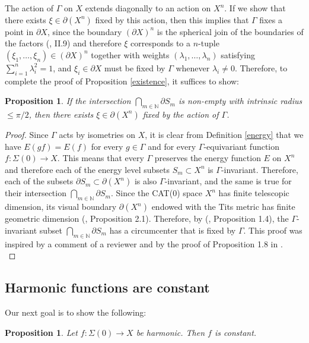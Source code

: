 \documentclass{article}
\theoremstyle{definition}
\theoremstyle{remark}
\theoremstyle{plain}
\newtheorem{prp}[dfn]{Proposition}
\begin{document}
The action of $\Gamma$ on $X$ extends diagonally to an action on $X^n$. If we show that there exists $\xi\in\partial(X^n)$ fixed by this action, then this implies that $\Gamma$ fixes a point in $\partial X$, since the boundary $(\partial X)^n$ is the spherical join of the boundaries of the factors (\cite{bh}, II.9) and therefore $\xi$ corresponds to a $n$-tuple $(\xi_1,\ldots,\xi_n)\in(\partial X)^n$ together with weights $(\lambda_1,\ldots,\lambda_n)$ satisfying $\sum_{i=1}^{n}{\lambda_i^2}=1$, and $\xi_i\in\partial X$ must be fixed by $\Gamma$ whenever $\lambda_i\neq 0$. Therefore, to complete the proof of Proposition \ref{existence}, it suffices to show:

\begin{prp}
    If the intersection $\bigcap_{m\in\mathbb{N}}{\partial S_m}$ is non-empty with intrinsic radius $\leq\pi/2$, then there exists $\xi\in\partial(X^n)$ fixed by the action of $\Gamma$.
\end{prp}

\begin{proof}
    Since $\Gamma$ acts by isometries on $X$, it is clear from Definition \ref{energy} that we have $E(gf)=E(f)$ for every $g\in\Gamma$ and for every $\Gamma$-equivariant function $f: \Sigma(0)\rightarrow X$. This means that every $\Gamma$ preserves the energy function $E$ on $X^n$ and therefore each of the energy level subsets $S_m\subset X^n$ is $\Gamma$-invariant. Therefore, each of the subsets $\partial S_m\subset\partial(X^n)$ is also $\Gamma$-invariant, and the same is true for their intersection $\bigcap_{m\in\mathbb{N}}{\partial S_m}$. Since the CAT(0) space $X^n$ has finite telescopic dimension, its visual boundary $\partial(X^n)$ endowed with the Tits metric has finite geometric dimension (\cite{caply}, Proposition 2.1). Therefore, by (\cite{bally}, Proposition 1.4), the $\Gamma$-invariant subset $\bigcap_{m\in\mathbb{N}}{\partial S_m}$ has a circumcenter that is fixed by $\Gamma$. This proof was inspired by a comment of a reviewer and by the proof of Proposition 1.8 in \cite{caply}. \\
\end{proof}

\subsection{Harmonic functions are constant}

Our next goal is to show the following:

\begin{prp} \label{constant}
    Let $f: \Sigma(0)\rightarrow X$ be harmonic. Then $f$ is constant.
\end{prp}
\end{document}
